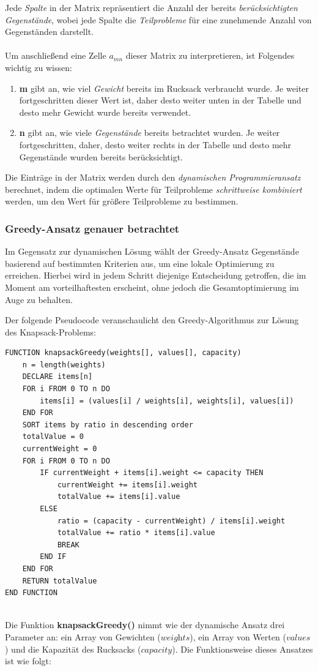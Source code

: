 Jede \textit{Spalte} in der Matrix repräsentiert die Anzahl der bereits \textit{berücksichtigten Gegenstände}, wobei jede
Spalte die \textit{Teilprobleme} für eine zunehmende Anzahl von Gegenständen darstellt.\\
\\
Um anschließend eine Zelle \( a_{mn} \) dieser Matrix zu interpretieren, ist Folgendes wichtig zu wissen:
\begin{enumerate}
\item \textbf{m} gibt an, wie viel \textit{Gewicht} bereits im Rucksack verbraucht wurde. Je weiter fortgeschritten dieser
Wert ist, daher desto weiter unten in der Tabelle und desto mehr Gewicht wurde bereits verwendet.
\item \textbf{n} gibt an, wie viele \textit{Gegenstände} bereits betrachtet wurden. Je weiter fortgeschritten, daher,
desto weiter rechts in der Tabelle und desto mehr Gegenstände wurden bereits berücksichtigt.
\end{enumerate}

Die Einträge in der Matrix werden durch den \textit{dynamischen Programmieransatz} berechnet, indem die optimalen Werte für
Teilprobleme \textit{schrittweise kombiniert} werden, um den Wert für größere Teilprobleme zu bestimmen.

\subsubsection*{Greedy-Ansatz genauer betrachtet}
Im Gegensatz zur dynamischen Lösung wählt der Greedy-Ansatz Gegenstände basierend auf bestimmten Kriterien aus, um eine
lokale Optimierung zu erreichen. Hierbei wird in jedem Schritt diejenige Entscheidung getroffen, die im Moment am
vorteilhaftesten erscheint, ohne jedoch die Gesamtoptimierung im Auge zu behalten.

Der folgende Pseudocode veranschaulicht den Greedy-Algorithmus zur Lösung des Knapsack-Problems:

\begin{lstlisting}[style=csharp, caption={Greedy Algorithmus}]
FUNCTION knapsackGreedy(weights[], values[], capacity)
    n = length(weights)
    DECLARE items[n]
    FOR i FROM 0 TO n DO
        items[i] = (values[i] / weights[i], weights[i], values[i])
    END FOR
    SORT items by ratio in descending order
    totalValue = 0
    currentWeight = 0
    FOR i FROM 0 TO n DO
        IF currentWeight + items[i].weight <= capacity THEN
            currentWeight += items[i].weight
            totalValue += items[i].value
        ELSE
            ratio = (capacity - currentWeight) / items[i].weight
            totalValue += ratio * items[i].value
            BREAK
        END IF
    END FOR
    RETURN totalValue
END FUNCTION
\end{lstlisting}\\
Die Funktion \textbf{knapsackGreedy()} nimmt wie der dynamische Ansatz drei Parameter an: ein Array von Gewichten (\( \textit{weights} \)),
ein Array von Werten (\( \textit{values} \)) und die Kapazität des Rucksacks (\( \textit{capacity} \)). Die Funktionsweise
dieses Ansatzes ist wie folgt:

